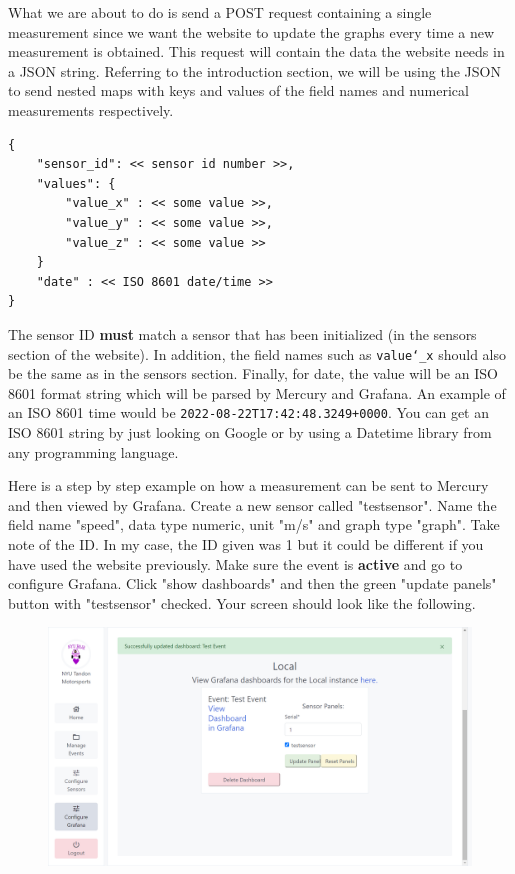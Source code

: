 \documentclass[12pt, letterpaper]{article}
\begin{document}
{{{{{{{{{{{{\par What we are about to do is send a POST request containing a single measurement since we want the website to update the graphs every time a new measurement is obtained. This request will contain the data the website needs in a JSON string. Referring to the introduction section, we will be using the JSON to send nested maps with keys and values of the field names and numerical measurements respectively. 

\begin{verbatim}
{
    "sensor_id": << sensor id number >>,
    "values": {
        "value_x" : << some value >>,
        "value_y" : << some value >>,
        "value_z" : << some value >>
    }
    "date" : << ISO 8601 date/time >>
}
\end{verbatim}

\par The sensor ID \textbf{must} match a sensor that has been initialized (in the sensors section of the website). In addition, the field names such as \texttt{value\char`_x} should also be the same as in the sensors section. Finally, for date, the value will be an ISO 8601 format string which will be parsed by Mercury and Grafana. An example of an ISO 8601 time would be \texttt{2022-08-22T17:42:48.3249+0000}. You can get an ISO 8601 string by just looking on Google or by using a Datetime library from any programming language. 
\par Here is a step by step example on how a measurement can be sent to Mercury and then viewed by Grafana. Create a new sensor called "testsensor". Name the field name "speed", data type numeric, unit "m/s" and graph type "graph". Take note of the ID. In my case, the ID given was 1 but it could be different if you have used the website previously. Make sure the event is \textbf{active} and go to configure Grafana. Click "show dashboards" and then the green "update panels" button with "testsensor" checked. Your screen should look like the following. 
\begin{figure}[h!]
	\centering
	\includegraphics[width=1\columnwidth]{assets/update_panels.png}

\end{figure}}}}}}}}}}}}}
\end{document}
